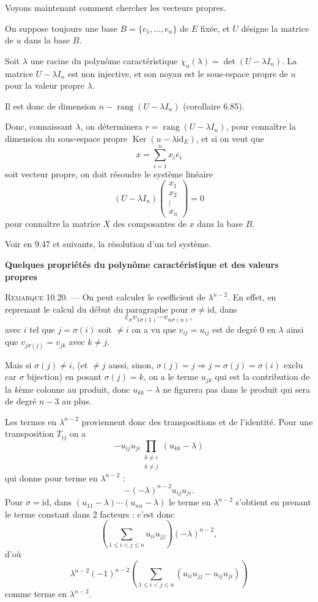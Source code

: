 Voyons maintenant comment chercher les vecteurs propres.

On suppose toujours une base $B=\{e_1,\ldots,e_n\}$ de $E$ fixée, et $U$ désigne la matrice de $u$ dans la base $B$.

Soit $\lambda$ une racine du polynôme caractéristique $\chi_u(\lambda)=\det(U-\lambda I_n)$. La matrice $U-\lambda I_n$ est non injective, et son noyau est le sous-espace propre de $u$ pour la valeur propre $\lambda$.

Il est donc de dimension $n-\operatorname{rang}(U-\lambda I_n)$ (corollaire 6.85).

Donc, connaissant $\lambda$, on déterminera $r=\operatorname{rang}(U-\lambda I_n)$, pour connaître la dimension du sous-espace propre $\operatorname{Ker}(u-\lambda\mathrm{id}_E)$, et si on veut que
\[
x=\sum_{i=1}^nx_ie_i
\]
soit vecteur propre, on doit résoudre le système linéaire
\[
(U-\lambda I_n)
\begin{pmatrix}x_1\\x_2\\\vdots\\x_n\end{pmatrix}=0
\]
pour connaître la matrice $X$ des composantes de $x$ dans la base $B$.

Voir en 9.47 et suivants, la résolution d'un tel système.

\medskip\noindent\textbf{Quelques propriétés du polynôme caractéristique et des valeurs propres}

\medskip\noindent\textsc{Remarque 10.20.} --- On peut calculer le coefficient de $\lambda^{n-2}$. En effet, en reprenant le calcul du début du paragraphe pour $\sigma\ne\mathrm{id}$, dans
\[
\varepsilon_\sigma v_{1\sigma(1)}\cdots v_{n\sigma(n)},
\]
avec $i$ tel que $j=\sigma(i)$ soit $\ne i$ on a vu que $v_{ij}=u_{ij}$ est de degré 0 en $\lambda$ ainsi que $v_{j\sigma(j)}=v_{jk}$ avec $k\ne j$.

Mais si $\sigma(j)\ne i$, (et $\ne j$ aussi, sinon, $\sigma(j)=j\Rightarrow j=\sigma(j)=\sigma(i)$ exclu car $\sigma$ bijection) en posant $\sigma(j)=k$, on a le terme $u_{jk}$ qui est la contribution de la $k$ème colonne au produit, donc $u_{kk}-\lambda$ ne figurera pas dans le produit qui sera de degré $n-3$ au plus.

Les termes en $\lambda^{n-2}$ proviennent donc des transpositions et de l'identité. Pour une transposition $T_{ij}$ on a
\[
-u_{ij}u_{ji}\prod_{\substack{k\ne i\\k\ne j}}(u_{kk}-\lambda)
\]
qui donne pour terme en $\lambda^{n-2}$ :
\[
-(-\lambda)^{n-2}u_{ij}u_{ji}.
\]
Pour $\sigma=\mathrm{id}$, dans $(u_{11}-\lambda)\cdots(u_{nn}-\lambda)$ le terme en $\lambda^{n-2}$ s'obtient en prenant le terme constant dans 2 facteurs : c'est donc
\[
\left(\sum_{1\le i<j\le n}u_{ii}u_{jj}\right)(-\lambda)^{n-2},
\]
d'où
\[
\lambda^{n-2}(-1)^{n-2}
\left(\sum_{1\le i<j\le n}(u_{ii}u_{jj}-u_{ij}u_{ji})\right)
\]
comme terme en $\lambda^{n-2}$.

